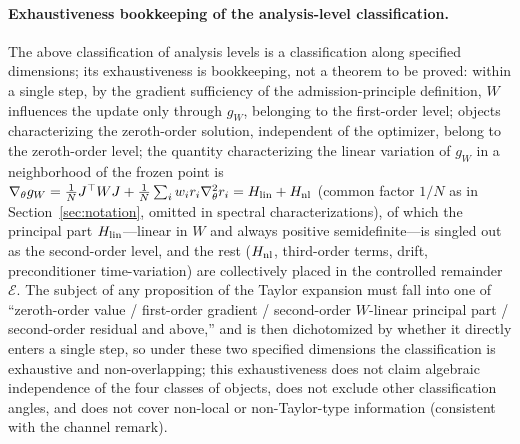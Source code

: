 \documentclass[11pt]{article}
\newcommand{\W}{W}
\newcommand{\Erem}{\mathcal E}
\numberwithin{equation}{section}
\begin{document}
\paragraph{Exhaustiveness bookkeeping of the analysis-level classification.}
The above classification of analysis levels is a classification along specified dimensions; its exhaustiveness is bookkeeping, not a theorem to be proved: within a single step, by the gradient sufficiency of the admission-principle definition, $\W$ influences the update only through $g_{\W}$, belonging to the first-order level; objects characterizing the zeroth-order solution, independent of the optimizer, belong to the zeroth-order level; the quantity characterizing the linear variation of $g_{\W}$ in a neighborhood of the frozen point is $\nabla_\theta g_{\W}=\tfrac1N J^\top\W J+\tfrac1N\sum_iw_ir_i\nabla_\theta^2r_i=H_{\rm lin}+H_{\rm nl}$ (common factor $1/N$ as in Section~\ref{sec:notation}, omitted in spectral characterizations), of which the principal part $H_{\rm lin}$---linear in $\W$ and always positive semidefinite---is singled out as the second-order level, and the rest ($H_{\rm nl}$, third-order terms, drift, preconditioner time-variation) are collectively placed in the controlled remainder $\Erem$. The subject of any proposition of the Taylor expansion must fall into one of ``zeroth-order value / first-order gradient / second-order $\W$-linear principal part / second-order residual and above,'' and is then dichotomized by whether it directly enters a single step, so under these two specified dimensions the classification is exhaustive and non-overlapping; this exhaustiveness does not claim algebraic independence of the four classes of objects, does not exclude other classification angles, and does not cover non-local or non-Taylor-type information (consistent with the channel remark).
\end{document}
